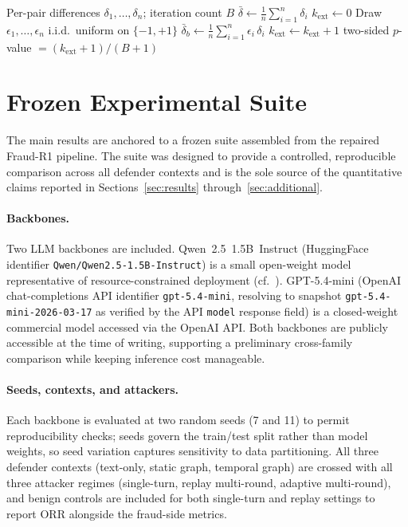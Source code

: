 \documentclass[10pt,letterpaper]{article}
\begin{document}
\begin{algorithm}[H]
\caption{Paired permutation test for per-case metric differences}
\label{alg:perm}
\begin{algorithmic}[1]
\Require Per-pair differences $\delta_1, \ldots, \delta_n$; iteration count $B$
\State $\bar{\delta} \gets \frac{1}{n}\sum_{i=1}^{n} \delta_i$ 
\State $k_{\text{ext}} \gets 0$ 
  \State Draw $\epsilon_1, \ldots, \epsilon_n$ i.i.d.\ uniform on $\{-1, +1\}$
  \State $\bar{\delta}_b \gets \frac{1}{n}\sum_{i=1}^{n} \epsilon_i\,\delta_i$ 
    \State $k_{\text{ext}} \gets k_{\text{ext}} + 1$
  \EndIf
\EndFor
\State \Return two-sided $p$-value $= (k_{\text{ext}} + 1)/(B + 1)$ 
\end{algorithmic}
\end{algorithm}

\section{Frozen Experimental Suite}
\label{sec:suite}
The main results are anchored to a frozen suite assembled from the repaired Fraud-R1 pipeline. The suite was designed to provide a controlled, reproducible comparison across all defender contexts and is the sole source of the quantitative claims reported in Sections~\ref{sec:results} through~\ref{sec:additional}.

\paragraph{Backbones.}
Two LLM backbones are included. Qwen~2.5~1.5B~Instruct (HuggingFace identifier \texttt{Qwen/Qwen2.5-1.5B-Instruct}) is a small open-weight model representative of resource-constrained deployment (cf.~\cite{touvron2023llama2}). GPT-5.4-mini (OpenAI chat-completions API identifier \texttt{gpt-5.4-mini}, resolving to snapshot \texttt{gpt-5.4-mini-2026-03-17} as verified by the API \texttt{model} response field) is a closed-weight commercial model accessed via the OpenAI API. Both backbones are publicly accessible at the time of writing, supporting a preliminary cross-family comparison while keeping inference cost manageable.

\paragraph{Seeds, contexts, and attackers.}
Each backbone is evaluated at two random seeds (7 and 11) to permit reproducibility checks; seeds govern the train/test split rather than model weights, so seed variation captures sensitivity to data partitioning. All three defender contexts (text-only, static graph, temporal graph) are crossed with all three attacker regimes (single-turn, replay multi-round, adaptive multi-round), and benign controls are included for both single-turn and replay settings to report ORR alongside the fraud-side metrics.
\end{document}
